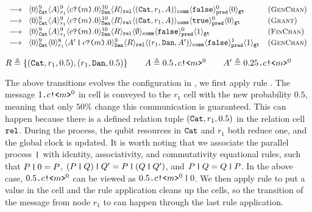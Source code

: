 {\footnotesize
\[
\begin{array}{ll}
\longrightarrow\;\;
\langle 0 \rangle^{9}_{\texttt{Cat}}\langle A \rangle^{9}_{r_1}
\langle c\texttt{?(}m\texttt{)}.0 \rangle^{10}_{\texttt{Dan}} 
\langle R \rangle_{\texttt{rel}}
\langle (\texttt{Cat},r_1,A) \rangle_{\texttt{comm}}
\langle \texttt{false} \rangle^{0}_{\texttt{pred}}
\langle 0 \rangle_{\texttt{gt}}
&
({\small \textsc{GenChan}})
\\[0.2em]
\longrightarrow\;\;
\langle 0 \rangle^{9}_{\texttt{Cat}}\langle A \rangle^{9}_{r_1}
\langle c\texttt{?(}m\texttt{)}.0 \rangle^{10}_{\texttt{Dan}} 
\langle R \rangle_{\texttt{rel}}
\langle (\texttt{Cat},r_1,A) \rangle_{\texttt{comm}}
\langle \texttt{true} \rangle^{0}_{\texttt{pred}}
\langle 0 \rangle_{\texttt{gt}}
&
({\small \textsc{Grant}})
\\[0.2em]
\longrightarrow\;\;
\langle 0 \rangle^{9}_{\texttt{Cat}}\langle A \rangle^{9}_{r_1}
\langle c\texttt{?(}m\texttt{)}.0 \rangle^{10}_{\texttt{Dan}} 
\langle R \rangle_{\texttt{rel}}
\langle \emptyset \rangle_{\texttt{comm}}
\langle \texttt{false} \rangle^{0}_{\texttt{pred}}
\langle 1 \rangle_{\texttt{gt}}
&
({\small \textsc{FinChan}})
\\[0.2em]
\longrightarrow\;\;
\langle 0 \rangle^{9}_{\texttt{Cat}}\langle 0 \rangle^{8}_{r_1}
\langle A'\,\texttt{|}\,c\texttt{?(}m\texttt{)}.0 \rangle^{9}_{\texttt{Dan}} 
\langle R \rangle_{\texttt{rel}}
\langle (r_1,\texttt{Dan},A') \rangle_{\texttt{comm}}
\langle \texttt{false} \rangle^{1}_{\texttt{pred}}
\langle 1 \rangle_{\texttt{gt}}
&
({\small \textsc{GenChan}})
\end{array}
\]
}
{\footnotesize
\begin{center}
$R\triangleq\{(\texttt{Cat},r_1,0.5), (r_1,\texttt{Dan},0.5)\}
\qquad
A\triangleq0.5\texttt{.}c\texttt{!<}m\texttt{>}^0
\qquad
A'\triangleq0.25\texttt{.}c\texttt{!<}m\texttt{>}^0$
\end{center}
}

The above transitions evolves the configuration in , we first apply rule . The message $1\texttt{.}c\texttt{!<}m\texttt{>}^0$ in cell  is conveyed to the $r_1$ cell with the new probability $0.5$, meaning that only $50\%$ change this communication is guaranteed.
This can happen because there is a defined relation tuple $(\texttt{Cat},r_1,0.5)$ in the relation cell $\texttt{rel}$. During the process, the qubit resources in $\texttt{Cat}$ and $r_1$ both reduce one, and the global clock is updated. 
It is worth noting that 
we associate the parallel process $\texttt{|}$ with identity, associativity, and commutativity equational rules, 
such that $P\,\texttt{|}\,0=P$, $(P\,\texttt{|}\,Q)\,\texttt{|}\,Q'=P\,\texttt{|}\,(Q\,\texttt{|}\,Q')$, and $P\,\texttt{|}\,Q=Q\,\texttt{|}\,P$.
In the above case, $0.5\texttt{.}c\texttt{!<}m\texttt{>}^0$ can be viewed as $0.5\texttt{.}c\texttt{!<}m\texttt{>}^0\,\texttt{|}\,0$.
We then apply rule  to put a  value in the  cell and the  rule application cleans up the cells, so the transition of the message from node $r_1$ to  can happen through the last  rule application.

